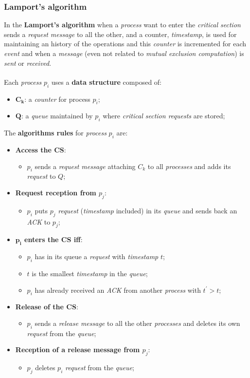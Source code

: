 \documentclass{article}
\begin{document}
\subsubsection{Lamport's algorithm}
In the \textbf{Lamport's algorithm} when a \emph{process} want to enter the \emph{critical section} sends a \emph{request message} to all the other, and a counter, \emph{timestamp}, is used for maintaining an history of the operations and this \emph{counter} is incremented for each \emph{event} and when a \emph{message} (even not related to \emph{mutual exclusion computation}) is \emph{sent} or \emph{received}. \\\\
Each \emph{process} $p_i$ uses a \textbf{data structure} composed of:
\begin{itemize}
\item $\mathbf{C_k}$: a \emph{counter} for process $p_i$;
\item $\mathbf{Q}$: a \emph{queue} maintained by $p_i$ where \emph{critical section requests} are stored;
\end{itemize}
The \textbf{algorithms rules} for \emph{process} $p_i$ are:
\begin{itemize}
\item \textbf{Access the CS}:  
\begin{itemize}
\item $p_i$ sends a \emph{request message} attaching $C_k$ to all \emph{processes} and adds its \emph{request} to $Q$;
\end{itemize}
\item \textbf{Request reception from $p_j$}:
\begin{itemize}
\item $p_i$ puts $p_j$ \emph{request} (\emph{timestamp} included) in its \emph{queue} and sends back an \emph{ACK} to $p_j$;
\end{itemize}
\item \textbf{$\mathbf{p_i}$ enters the CS iff}:
\begin{itemize}
\item $p_i$ has in its queue a \emph{request} with \emph{timestamp} $t$;
\item $t$ is the smallest \emph{timestamp} in the \emph{queue};
\item $p_i$ has already received an \emph{ACK} from another \emph{process} with $t^{'}>t$;
\end{itemize}
\item \textbf{Release of the CS}:
\begin{itemize}
\item $p_i$ sends a \emph{release message} to all the other \emph{processes} and deletes its own \emph{request} from the \emph{queue};
\end{itemize}
\item \textbf{Reception of a release message from $p_j$}:
\begin{itemize}
\item $p_j$ deletes $p_i$ \emph{request} from the \emph{queue};
\end{itemize}
\end{itemize}
\end{document}
